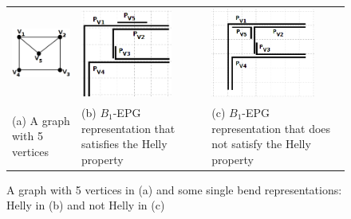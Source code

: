 \begin{figure}[h]
  \centering
  \begin{tabular}{ p{4cm} p{4cm} p{4cm} }
    \centering \includegraphics[width=2.5cm]{./img/envelope.png} & \includegraphics[width=3cm]{./img/envelopeHellyGradeTransparente.png} & \includegraphics[width=3.4cm]{./img/envelopeNaoHellyGrade.png}
    \\
    \footnotesize \centering (a) A  graph with 5 vertices & \footnotesize(b) $B_1$-EPG representation that satisfies the Helly property & \footnotesize (c) $B_1$-EPG representation that does  not satisfy the Helly property  \\


  \end{tabular}
\caption{A  graph with 5 vertices in (a) and some single bend representations: Helly in (b) and not Helly in (c)} \label{fig:envelopeRepresentacoes}
\end{figure}
